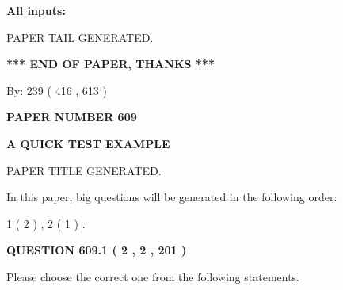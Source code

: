 \documentclass[12pt]{article}
\begin{document}
   
   
   
\noindent{}
   
   
   
   
\noindent\vspace{0.1in}\hspace{-0.08in} {\textbf{\Large{All inputs: }}}
   
   
   
   
   
   
 \vspace{0.2in}
 
   
   
\vspace{2.0in} PAPER TAIL GENERATED.
   
   
   
   
\vspace{1.0in} 
{\textbf{\large{ *** END OF PAPER, THANKS *** }}} 
   
   
\hspace{1.0in} By: 
 239 ( 416 ,  613 )
   
   
   
   
\newpage 
\setcounter{page}{ 
   609001 } 
   
   
   
   
 {\textbf{ \Large{ PAPER NUMBER  609  }}}
   
   
\vspace{0.2in}
   
   
   
   
   
   
   
   
 \vspace{0.2in}
{\LARGE {\textbf{ A QUICK TEST EXAMPLE}}}
   
   
 PAPER TITLE GENERATED.
   
   
   
\vspace{0.2in}
   
In this paper, big questions will be generated in the following order: 
   
   
   1 ( 2 )
 ,
   2 ( 1 )
 .
  
\vspace{0.2in}
  
{\textbf{\Large{QUESTION
609.1 
 ( 2 , 2 , 201 )
}}}
  
  
Please choose the correct one from the following statements.
 
\end{document}
